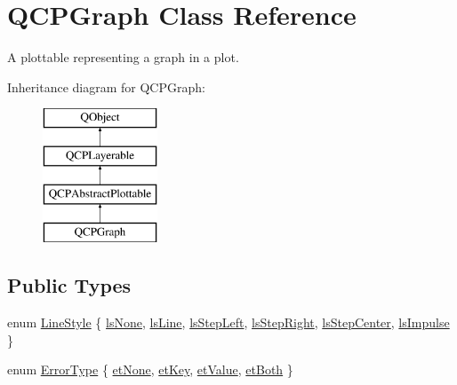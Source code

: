 \hypertarget{class_q_c_p_graph}{}\section{Q\+C\+P\+Graph Class Reference}
\label{class_q_c_p_graph}


A plottable representing a graph in a plot.  


Inheritance diagram for Q\+C\+P\+Graph\+:\begin{figure}[H]
\begin{center}
\leavevmode
\includegraphics[height=4.000000cm]{class_q_c_p_graph}
\end{center}
\end{figure}
\subsection*{Public Types}
\begin{DoxyCompactItemize}
\item 
enum \mbox{\hyperlink{class_q_c_p_graph_ad60175cd9b5cac937c5ee685c32c0859}{Line\+Style}} \{ \newline
\mbox{\hyperlink{class_q_c_p_graph_ad60175cd9b5cac937c5ee685c32c0859aea9591b933733cc7b20786b71e60fa04}{ls\+None}}, 
\mbox{\hyperlink{class_q_c_p_graph_ad60175cd9b5cac937c5ee685c32c0859a3c42a27b15aa3c92d399082fad8b7515}{ls\+Line}}, 
\mbox{\hyperlink{class_q_c_p_graph_ad60175cd9b5cac937c5ee685c32c0859ae10568bda57836487d9dec5eba1d6c6e}{ls\+Step\+Left}}, 
\mbox{\hyperlink{class_q_c_p_graph_ad60175cd9b5cac937c5ee685c32c0859a9c37951f7d11aa070100fd16f2935c9e}{ls\+Step\+Right}}, 
\newline
\mbox{\hyperlink{class_q_c_p_graph_ad60175cd9b5cac937c5ee685c32c0859a5adf7b04da215a40a764c21294ea7366}{ls\+Step\+Center}}, 
\mbox{\hyperlink{class_q_c_p_graph_ad60175cd9b5cac937c5ee685c32c0859aa3b358b4ae7cca94aceeb8e529c12ebb}{ls\+Impulse}}
 \}
\item 
enum \mbox{\hyperlink{class_q_c_p_graph_ad23b514404bd2cb3216f57c90904d6af}{Error\+Type}} \{ \mbox{\hyperlink{class_q_c_p_graph_ad23b514404bd2cb3216f57c90904d6afaeae745e7cc1766bb8546e35d4b76a711}{et\+None}}, 
\mbox{\hyperlink{class_q_c_p_graph_ad23b514404bd2cb3216f57c90904d6afa2a5d89cd76fb8b6b18d71b8f6f6c0f43}{et\+Key}}, 
\mbox{\hyperlink{class_q_c_p_graph_ad23b514404bd2cb3216f57c90904d6afa147022ccdc49f6bd48f904cb4f61872e}{et\+Value}}, 
\mbox{\hyperlink{class_q_c_p_graph_ad23b514404bd2cb3216f57c90904d6afa761cb7d61670c1e2efecccd8974409ab}{et\+Both}}
 \}
\end{DoxyCompactItemize}
